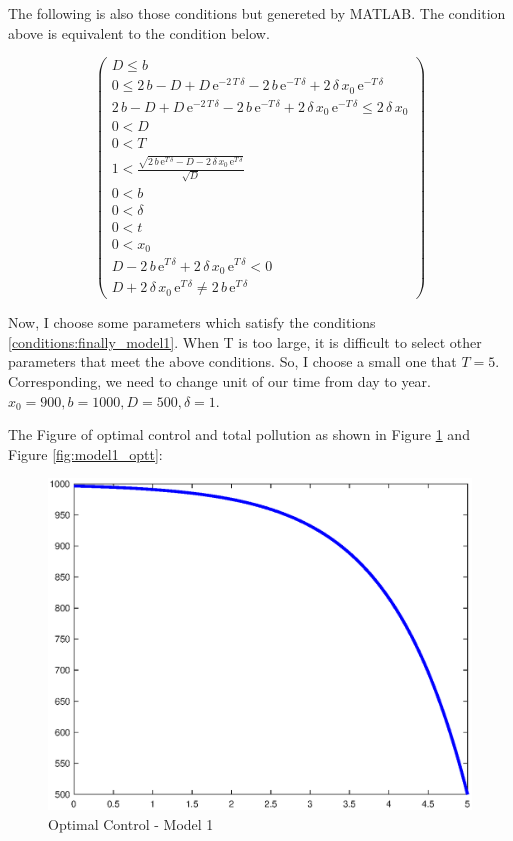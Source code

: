 \documentclass{article}
\newlength\imagewidth
\begin{document}
The following is also those conditions but genereted by MATLAB. The condition above is equivalent to the condition below.

\begin{equation}
\left(\begin{array}{cccccccccccc} D\leq b \\ 0\leq 2\,b-D+D\,{\mathrm{e}}^{-2\,T\,\delta }-2\,b\,{\mathrm{e}}^{-T\,\delta }+2\,\delta \,x_{0}\,{\mathrm{e}}^{-T\,\delta } \\ 2\,b-D+D\,{\mathrm{e}}^{-2\,T\,\delta }-2\,b\,{\mathrm{e}}^{-T\,\delta }+2\,\delta \,x_{0}\,{\mathrm{e}}^{-T\,\delta }\leq 2\,\delta \,x_{0} \\ 0<D \\ 0<T \\ 1<\frac{\sqrt{2\,b\,{\mathrm{e}}^{T\,\delta }-D-2\,\delta \,x_{0}\,{\mathrm{e}}^{T\,\delta }}}{\sqrt{D}} \\ 0<b \\ 0<\delta  \\ 0<t \\ 0<x_{0} \\ D-2\,b\,{\mathrm{e}}^{T\,\delta }+2\,\delta \,x_{0}\,{\mathrm{e}}^{T\,\delta }<0 \\ D+2\,\delta \,x_{0}\,{\mathrm{e}}^{T\,\delta }\neq 2\,b\,{\mathrm{e}}^{T\,\delta } \end{array}\right)
\end{equation}

Now, I choose some parameters which satisfy the conditions \eqref{conditions:finally_model1}. When T is too large, it is difficult to select other parameters that meet the above conditions. So, I choose a small one that $T=5$. Corresponding, we need to change unit of our time from  day to year. $x_0=900, b=1000, D=500, \delta=1 $.

The Figure of optimal control and total pollution as shown in Figure \ref{fig:model1_optc} and Figure \ref{fig:model1_optt}:


\begin{figure}[!ht]
    \centering
    \includegraphics[width=1.5\imagewidth]{Model1-optc.eps}
    \caption{Optimal Control - Model 1}
    \label{fig:model1_optc}
\end{figure}
\end{document}

